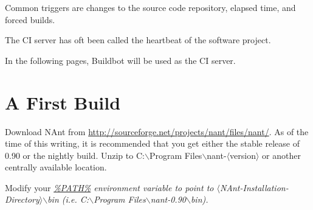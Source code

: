 Common triggers are changes to the source code repository, elapsed time, and forced builds.

The \gls{CI} server has oft been called the heartbeat of the software project.

In the following pages, \gls{Buildbot} will be used as the CI server.

\section{A First Build}

Download \gls{NAnt} from \url{http://sourceforge.net/projects/nant/files/nant/}. As of the time of this writing, it is recommended that you get
either the stable release of 0.90 or the nightly build. Unzip to C:$\backslash$Program Files$\backslash$nant-$\langle$version$\rangle$ or another centrally available 
location.

Modify your \em \hyperref[path]{\%PATH\%} \em environment variable to point to $\langle$NAnt-Installation-Directory$\rangle$$\backslash$bin (i.e. C:$\backslash$Program Files$\backslash$nant-0.90$\backslash$bin).
